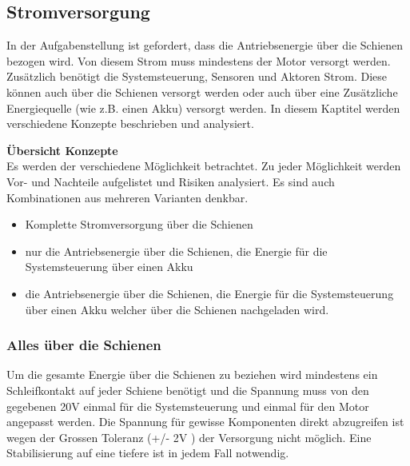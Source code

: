 \documentclass[../../main.tex]{subfiles}
\begin{document}
    \subsection{Stromversorgung}
    In der Aufgabenstellung ist gefordert, dass die Antriebsenergie über die Schienen bezogen wird. Von diesem Strom muss mindestens der Motor versorgt werden. Zusätzlich benötigt die Systemsteuerung, Sensoren und Aktoren Strom. Diese können auch über die Schienen versorgt werden oder auch über eine Zusätzliche Energiequelle (wie z.B. einen Akku) versorgt werden.
    In diesem Kaptitel werden verschiedene Konzepte beschrieben und analysiert.

    \textbf{Übersicht Konzepte}\\
    Es werden der verschiedene Möglichkeit betrachtet. Zu jeder Möglichkeit werden Vor- und Nachteile aufgelistet und Risiken analysiert. Es sind auch Kombinationen aus mehreren Varianten denkbar.

    \begin{itemize}
        \item Komplette Stromversorgung über die Schienen
        \item nur die Antriebsenergie über die Schienen, die Energie für die Systemsteuerung über einen Akku 
        \item die Antriebsenergie über die Schienen, die Energie für die Systemsteuerung über einen Akku welcher über die Schienen nachgeladen wird.
    \end{itemize}
    
    \subsubsection{Alles über die Schienen}
    Um die gesamte Energie über die Schienen zu beziehen wird mindestens ein Schleifkontakt auf jeder Schiene benötigt und die Spannung muss von den gegebenen 20V einmal für die Systemsteuerung und einmal für den Motor angepasst werden. Die Spannung für gewisse Komponenten direkt abzugreifen ist wegen der Grossen Toleranz (+/- 2V ) der Versorgung nicht möglich. Eine Stabilisierung auf eine tiefere ist in jedem Fall notwendig. 
    
\end{document}
